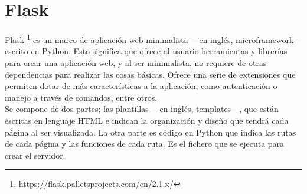 \section{Flask}
\label{sec:flask}
Flask \footnote{\url{https://flask.palletsprojects.com/en/2.1.x/}} es un marco de aplicación web minimalista ---en inglés, microframework--- escrito en Python. Esto significa que ofrece al usuario herramientas y librerías para crear una aplicación web, y al ser minimalista, no requiere de otras dependencias para realizar las cosas básicas. Ofrece una serie de extensiones que permiten dotar de más características a la aplicación, como autenticación o manejo a través de comandos, entre otros.\\
Se compone de dos partes; las plantillas ---en inglés, templates---, que están escritas en lenguaje HTML e indican la organización y diseño que tendrá cada página al ser visualizada. La otra parte es código en Python que indica las rutas de cada página y las funciones de cada ruta. Es el fichero que se ejecuta para crear el servidor.\\

